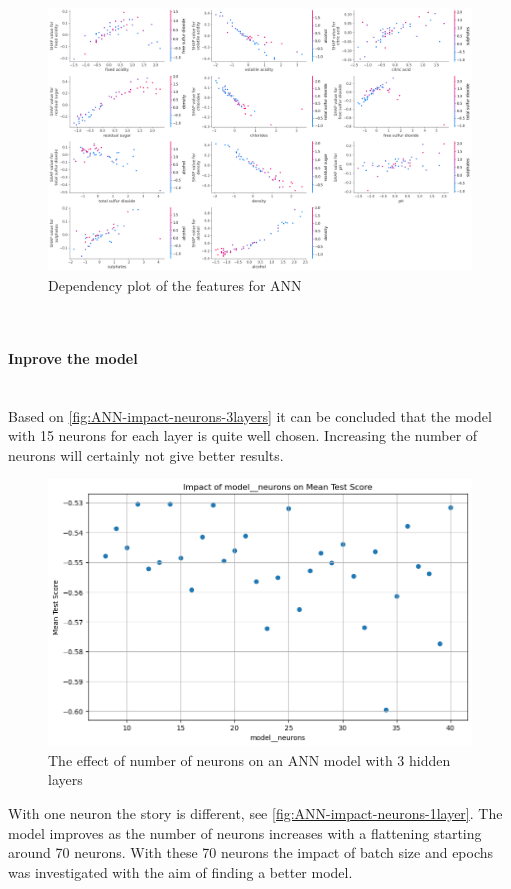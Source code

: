 \documentclass{article}
\newcommand{\subsubsubsection}[1]{%
  \paragraph{#1}\mbox{}\\}
\begin{document}
\begin{figure}
	\centering
	\includegraphics[width=\linewidth]{figures/shap_dependency_ann.png}
	\caption{Dependency plot of the features for ANN}
	\label{fig:dependency-plot-ann}
\end{figure}

\subsubsubsection{Inprove the model}
Based on \autoref{fig:ANN-impact-neurons-3layers} it can be concluded that the model with 15 neurons for each layer is quite well chosen. Increasing the number of neurons will certainly not give better results.

\begin{figure}
	\centering
	\includegraphics[width=\linewidth]{figures/ANN_impact_neurons_3layers.png}
	\caption{The effect of number of neurons on an ANN model with 3 hidden layers}
	\label{fig:ANN-impact-neurons-3layers}
\end{figure}

With one neuron the story is different, see \autoref{fig:ANN-impact-neurons-1layer}. The model improves as the number of neurons increases with a flattening starting around 70 neurons. With these 70 neurons the impact of batch size and epochs was investigated with the aim of finding a better model.
\end{document}
